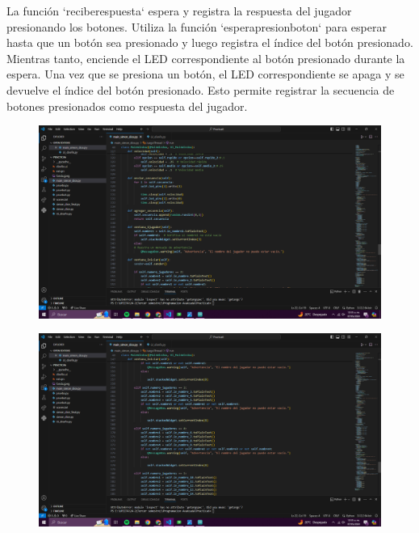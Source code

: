 \documentclass{article}
\begin{document}
{{\begin{figure}[h]
\end{figure}

{\Large La función `reciberespuesta` espera y registra la respuesta del jugador presionando los botones. Utiliza la función `esperapresionboton` para esperar hasta que un botón sea presionado y luego registra el índice del botón presionado. Mientras tanto, enciende el LED correspondiente al botón presionado durante la espera. Una vez que se presiona un botón, el LED correspondiente se apaga y se devuelve el índice del botón presionado. Esto permite registrar la secuencia de botones presionados como respuesta del jugador.

}

\newpage
\begin{figure}[h]
    \centering
    \includegraphics[width=1\textwidth]{Captura de pantalla (774).png}
    
\end{figure}

{\Large 

}

\newpage
\begin{figure}[h]
    \centering
    \includegraphics[width=1\textwidth]{Captura de pantalla (775).png}
    

\end{figure}}}
\end{document}
